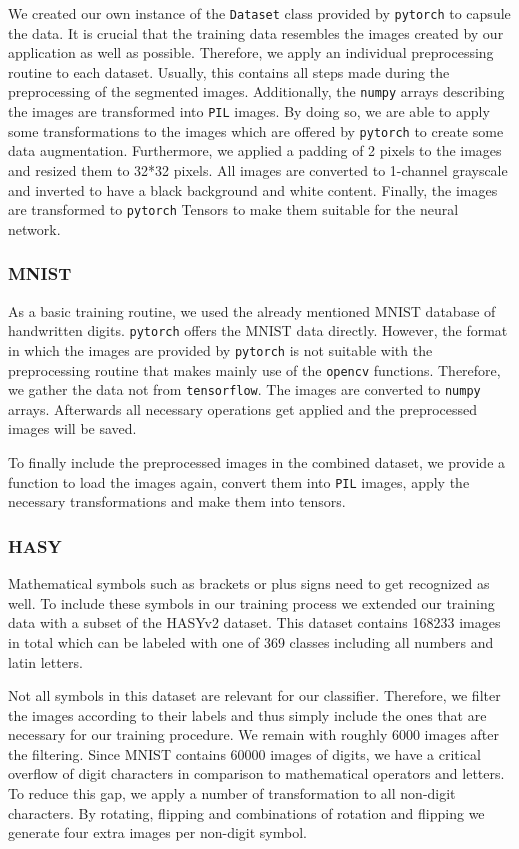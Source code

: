 \documentclass[12pt]{article}
\begin{document}
		We created our own instance of the \texttt{Dataset} class provided by \texttt{pytorch} to capsule the data. It is crucial that the training data resembles the images created by our application as well as possible. Therefore, we apply an individual preprocessing routine to each dataset. Usually, this contains all steps made during the preprocessing of the segmented images. Additionally, the \texttt{numpy} arrays describing the images are transformed into \texttt{PIL} images. By doing so, we are able to apply some transformations to the images which are offered by \texttt{pytorch} to create some data augmentation. Furthermore, we applied a padding of 2 pixels to the images and resized them to 32*32 pixels. All images are converted to 1-channel grayscale and inverted to have a black background and white content. Finally, the images are transformed to \texttt{pytorch} Tensors to make them suitable for the neural network. 
		
		\subsubsection{MNIST}
			As a basic training routine, we used the already mentioned MNIST database of handwritten digits\cite{mnist}. \texttt{pytorch} offers the MNIST data directly. However, the format in which the images are provided by \texttt{pytorch} is not suitable with the preprocessing routine that makes mainly use of the \texttt{opencv} functions. Therefore, we gather the data not from \texttt{tensorflow}. The images are converted to \texttt{numpy} arrays. Afterwards all necessary operations get applied and the preprocessed images will be saved. 
			
			To finally include the preprocessed images in the combined dataset, we provide a function to load the images again, convert them into \texttt{PIL} images, apply the necessary transformations and make them into tensors.
			
		\subsubsection{HASY}
			Mathematical symbols such as brackets or plus signs need to get recognized as well. To include these symbols in our training process we extended our training data with a subset of the HASYv2\cite{hasy} dataset. This dataset contains 168233 images in total which can be labeled with one of 369 classes including all numbers and latin letters. 
			
			Not all symbols in this dataset are relevant for our classifier. Therefore, we filter the images according to their labels and thus simply include the ones that are necessary for our training procedure. We remain with roughly 6000 images after the filtering. Since MNIST contains 60000 images of digits, we have a critical overflow of digit characters in comparison to mathematical operators and letters. To reduce this gap, we apply a number of transformation to all non-digit characters. By rotating, flipping and combinations of rotation and flipping we generate four extra images per non-digit symbol.
			
\end{document}
